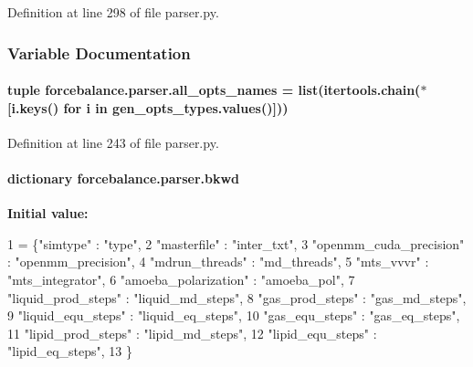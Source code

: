 Definition at line 298 of file parser.\-py.



\subsubsection{Variable Documentation}
\hypertarget{namespaceforcebalance_1_1parser_ae606fd3971c0081009e4bf63d50cc92f}{
\paragraph[{all\-\_\-opts\-\_\-names}]{\setlength{\rightskip}{0pt plus 5cm}tuple forcebalance.\-parser.\-all\-\_\-opts\-\_\-names = list(itertools.\-chain($\ast$\mbox{[}i.\-keys() for i in gen\-\_\-opts\-\_\-types.\-values()\mbox{]}))}}\label{namespaceforcebalance_1_1parser_ae606fd3971c0081009e4bf63d50cc92f}


Definition at line 243 of file parser.\-py.

\hypertarget{namespaceforcebalance_1_1parser_a121eaaef101563523a8fb20bd5ace409}{
\paragraph[{bkwd}]{\setlength{\rightskip}{0pt plus 5cm}dictionary forcebalance.\-parser.\-bkwd}}\label{namespaceforcebalance_1_1parser_a121eaaef101563523a8fb20bd5ace409}
{\bfseries Initial value\-:}
\begin{DoxyCode}
1 = \{\textcolor{stringliteral}{"simtype"} : \textcolor{stringliteral}{"type"}, 
2         \textcolor{stringliteral}{"masterfile"} : \textcolor{stringliteral}{"inter\_txt"}, 
3         \textcolor{stringliteral}{"openmm\_cuda\_precision"} : \textcolor{stringliteral}{"openmm\_precision"},
4         \textcolor{stringliteral}{"mdrun\_threads"} : \textcolor{stringliteral}{"md\_threads"},
5         \textcolor{stringliteral}{"mts\_vvvr"} : \textcolor{stringliteral}{"mts\_integrator"},
6         \textcolor{stringliteral}{"amoeba\_polarization"} : \textcolor{stringliteral}{"amoeba\_pol"},
7         \textcolor{stringliteral}{"liquid\_prod\_steps"} : \textcolor{stringliteral}{"liquid\_md\_steps"},
8         \textcolor{stringliteral}{"gas\_prod\_steps"} : \textcolor{stringliteral}{"gas\_md\_steps"},
9         \textcolor{stringliteral}{"liquid\_equ\_steps"} : \textcolor{stringliteral}{"liquid\_eq\_steps"},
10         \textcolor{stringliteral}{"gas\_equ\_steps"} : \textcolor{stringliteral}{"gas\_eq\_steps"},
11         \textcolor{stringliteral}{"lipid\_prod\_steps"} : \textcolor{stringliteral}{"lipid\_md\_steps"},
12         \textcolor{stringliteral}{"lipid\_equ\_steps"} : \textcolor{stringliteral}{"lipid\_eq\_steps"},
13         \}
\end{DoxyCode}


